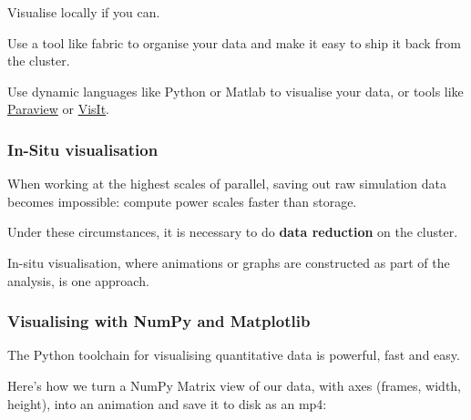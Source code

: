 Visualise locally if you can.

Use a tool like fabric to organise your data and make it easy to ship it
back from the cluster.

Use dynamic languages like Python or Matlab to visualise your data, or
tools like \href{http://www.paraview.org}{Paraview} or
\href{https://wci.llnl.gov/simulation/computer-codes/visit/}{VisIt}.

\subsubsection{In-Situ visualisation}\label{in-situ-visualisation}

When working at the highest scales of parallel, saving out raw
simulation data becomes impossible: compute power scales faster than
storage.

Under these circumstances, it is necessary to do \textbf{data reduction}
on the cluster.

In-situ visualisation, where animations or graphs are constructed as
part of the analysis, is one approach.

\subsubsection{Visualising with NumPy and
Matplotlib}\label{visualising-with-numpy-and-matplotlib}

The Python toolchain for visualising quantitative data is powerful, fast
and easy.

Here's how we turn a NumPy Matrix view of our data, with axes (frames,
width, height), into an animation and save it to disk as an mp4:

\begin{Shaded}
\begin{Highlighting}[]

 
 
 
     
         
        \NormalTok{)}

    \NormalTok{)}
\end{Highlighting}
\end{Shaded}

